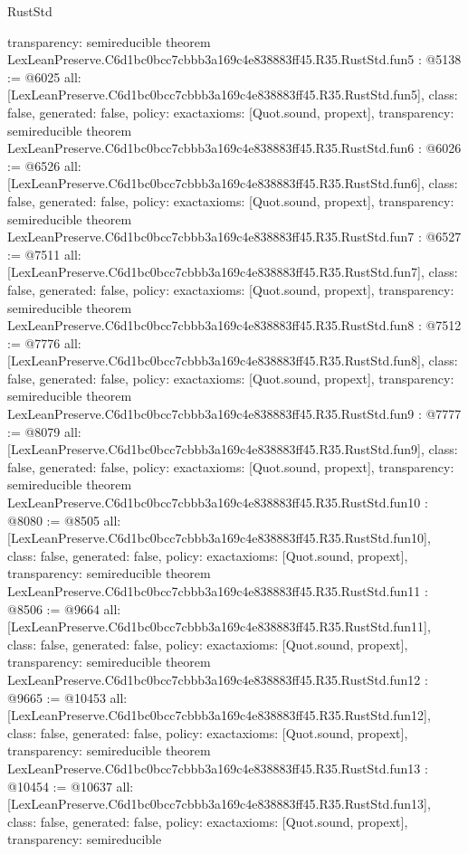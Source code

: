 \begin{lexlean}{RustStd}
\begin{coremodule}
{  transparency: semireducible
}
theorem LexLeanPreserve.C6d1bc0bcc7cbbb3a169c4e838883ff45.R35.RustStd.fun5 : @5138 := @6025 {
  all: [LexLeanPreserve.C6d1bc0bcc7cbbb3a169c4e838883ff45.R35.RustStd.fun5],
  class: false,
  generated: false,
  policy: exact{axioms: [Quot.sound, propext]},
  transparency: semireducible
}
theorem LexLeanPreserve.C6d1bc0bcc7cbbb3a169c4e838883ff45.R35.RustStd.fun6 : @6026 := @6526 {
  all: [LexLeanPreserve.C6d1bc0bcc7cbbb3a169c4e838883ff45.R35.RustStd.fun6],
  class: false,
  generated: false,
  policy: exact{axioms: [Quot.sound, propext]},
  transparency: semireducible
}
theorem LexLeanPreserve.C6d1bc0bcc7cbbb3a169c4e838883ff45.R35.RustStd.fun7 : @6527 := @7511 {
  all: [LexLeanPreserve.C6d1bc0bcc7cbbb3a169c4e838883ff45.R35.RustStd.fun7],
  class: false,
  generated: false,
  policy: exact{axioms: [Quot.sound, propext]},
  transparency: semireducible
}
theorem LexLeanPreserve.C6d1bc0bcc7cbbb3a169c4e838883ff45.R35.RustStd.fun8 : @7512 := @7776 {
  all: [LexLeanPreserve.C6d1bc0bcc7cbbb3a169c4e838883ff45.R35.RustStd.fun8],
  class: false,
  generated: false,
  policy: exact{axioms: [Quot.sound, propext]},
  transparency: semireducible
}
theorem LexLeanPreserve.C6d1bc0bcc7cbbb3a169c4e838883ff45.R35.RustStd.fun9 : @7777 := @8079 {
  all: [LexLeanPreserve.C6d1bc0bcc7cbbb3a169c4e838883ff45.R35.RustStd.fun9],
  class: false,
  generated: false,
  policy: exact{axioms: [Quot.sound, propext]},
  transparency: semireducible
}
theorem LexLeanPreserve.C6d1bc0bcc7cbbb3a169c4e838883ff45.R35.RustStd.fun10 : @8080 := @8505 {
  all: [LexLeanPreserve.C6d1bc0bcc7cbbb3a169c4e838883ff45.R35.RustStd.fun10],
  class: false,
  generated: false,
  policy: exact{axioms: [Quot.sound, propext]},
  transparency: semireducible
}
theorem LexLeanPreserve.C6d1bc0bcc7cbbb3a169c4e838883ff45.R35.RustStd.fun11 : @8506 := @9664 {
  all: [LexLeanPreserve.C6d1bc0bcc7cbbb3a169c4e838883ff45.R35.RustStd.fun11],
  class: false,
  generated: false,
  policy: exact{axioms: [Quot.sound, propext]},
  transparency: semireducible
}
theorem LexLeanPreserve.C6d1bc0bcc7cbbb3a169c4e838883ff45.R35.RustStd.fun12 : @9665 := @10453 {
  all: [LexLeanPreserve.C6d1bc0bcc7cbbb3a169c4e838883ff45.R35.RustStd.fun12],
  class: false,
  generated: false,
  policy: exact{axioms: [Quot.sound, propext]},
  transparency: semireducible
}
theorem LexLeanPreserve.C6d1bc0bcc7cbbb3a169c4e838883ff45.R35.RustStd.fun13 : @10454 := @10637 {
  all: [LexLeanPreserve.C6d1bc0bcc7cbbb3a169c4e838883ff45.R35.RustStd.fun13],
  class: false,
  generated: false,
  policy: exact{axioms: [Quot.sound, propext]},
  transparency: semireducible
}
\end{coremodule}
\end{lexlean}

